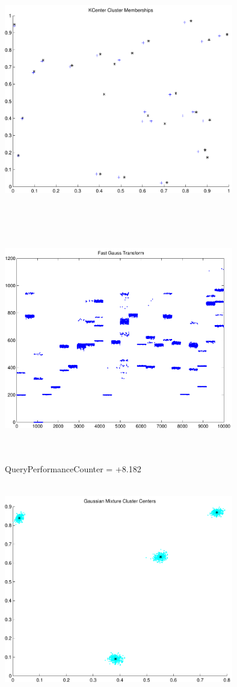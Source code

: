 \documentclass[9pt]{article}
\theoremstyle{plain}
\theoremstyle{definition}
\theoremstyle{remark}
\numberwithin{equation}{section}
\begin{document}
\includegraphics[width=10.0cm,height=10.0cm]{KCenterClusterMemberships_24_Centers.pdf}

\includegraphics[width=10.0cm,height=10.0cm]{FGT24_Centers.pdf}

QueryPerformanceCounter  =  +8.182
\includegraphics[width=10.0cm,height=10.0cm]{GaussianMixture_ClusterCenters4_Centers.pdf}
\end{document}
